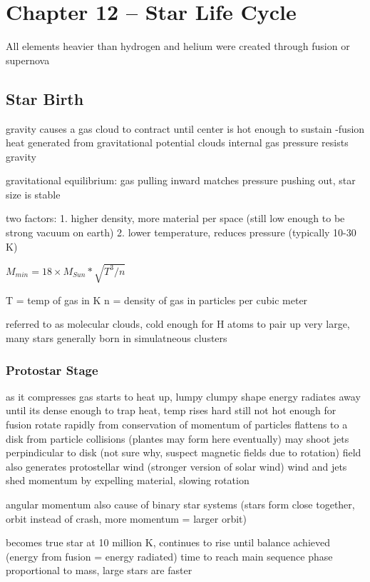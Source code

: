 \section{Chapter 12 -- Star Life Cycle}
All elements heavier than hydrogen and helium were created through fusion or supernova

\subsection{Star Birth}
gravity causes a gas cloud to contract until center is hot enough to sustain -fusion
heat generated from gravitational potential
clouds internal gas pressure resists gravity

gravitational equilibrium: gas pulling inward matches pressure pushing out, star size is stable

two factors:
    1. higher density, more material per space (still low enough to be strong vacuum on earth)
    2. lower temperature, reduces pressure (typically 10-30 K)

$M_{min} = 18 \times M_{Sun} * \sqrt{T^3 / n}$

T = temp of gas in K
n = density of gas in particles per cubic meter

referred to as molecular clouds, cold enough for H atoms to pair up
very large, many stars generally born in simulatneous clusters


\subsubsection{Protostar Stage}
    as it compresses gas starts to heat up, lumpy clumpy shape
    energy radiates away until its dense enough to trap heat, temp rises hard
    still not hot enough for fusion
    rotate rapidly from conservation of momentum of particles
    flattens to a disk from particle collisions (plantes may form here eventually)
    may shoot jets perpindicular to disk (not sure why, suspect magnetic fields due to rotation)
    field also generates protostellar wind (stronger version of solar wind)
    wind and jets shed momentum by expelling material, slowing rotation

    angular momentum also cause of binary star systems (stars form close together, orbit instead of crash, more momentum = larger orbit)

    becomes true star at 10 million K, continues to rise until balance achieved (energy from fusion = energy radiated)
    time to reach main sequence phase proportional to mass, large stars are faster

